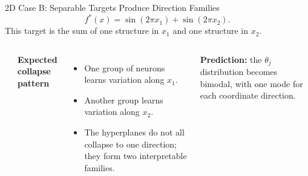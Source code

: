 \documentclass[aspectratio=169,10pt]{beamer}
\begin{document}
\begin{frame}{2D Case B: Separable Targets Produce Direction Families}
\vspace{-1cm}
\[
f^\ast(x)=\sin(2\pi x_1)+\sin(2\pi x_2).
\]
\vspace{0.5cm}
This target is the sum of one structure in $x_1$ and one structure in $x_2$.

\begin{columns}[T,onlytextwidth]
\begin{center}
\end{center}

\textbf{\textcolor{rtgnavy}{Expected collapse pattern}}
\begin{itemize}
  \item One group of neurons learns variation along $x_1$.
  \item Another group learns variation along $x_2$.
  \item The hyperplanes do not all collapse to one direction; they form two interpretable families.
\end{itemize}

\vspace{0.08cm}
\begin{tcolorbox}[slideboxB]
\centering\textbf{Prediction:} the $\theta_j$ distribution becomes bimodal, with one mode for each coordinate direction.
\end{tcolorbox}
\end{columns}
\end{frame}
\end{document}
